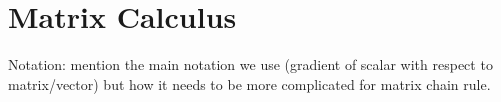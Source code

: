 \chapter{Matrix Calculus}\label{app:matrixCalculus}


Notation: mention the main notation we use (gradient of scalar with respect to matrix/vector) but how it needs to be more complicated for matrix chain rule.

